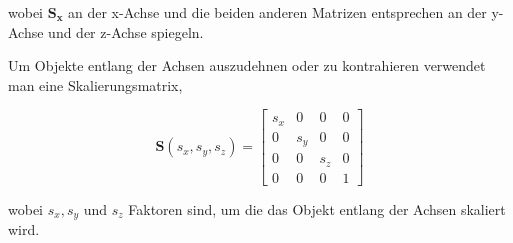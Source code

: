 wobei \( \boldsymbol{S_x} \) an der x-Achse und die beiden anderen Matrizen entsprechen an der y-Achse und der z-Achse spiegeln.

Um Objekte entlang der Achsen auszudehnen oder zu kontrahieren verwendet man eine Skalierungsmatrix,

\begin{equation*}
    \boldsymbol{S}(s_x, s_y, s_z) =
    \begin{bmatrix}
        s_x & 0 & 0 & 0 \\
        0 & s_y & 0 & 0 \\
        0 & 0 & s_z & 0 \\
        0 & 0 & 0 & 1
    \end{bmatrix}
\end{equation*}

wobei \( s_x, s_y \text{ und } s_z\) Faktoren sind, um die das Objekt entlang der Achsen skaliert wird.


